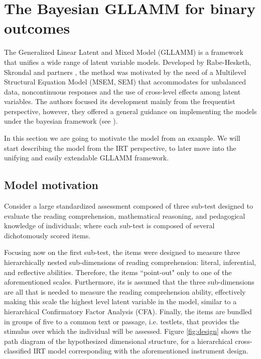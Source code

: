 \chapter{The Bayesian GLLAMM for binary outcomes} \label{chap:framework}

The Generalized Linear Latent and Mixed Model (GLLAMM) is a framework that unifies a wide range of latent variable models. Developed by Rabe-Hesketh, Skrondal and partners \cite{Rabe_et_al_2004a, Rabe_et_al_2004b, Rabe_et_al_2004c, Skrondal_et_al_2004a, Rabe_et_al_2012}, the method was motivated by the need of a Multilevel Structural Equation Model (MSEM, SEM) that accommodates for unbalanced data, noncontinuous responses and the use of cross-level effects among latent variables. The authors focused its development mainly from the frequentist perspective, however, they offered a general guidance on implementing the models under the bayesian framework (see \citet{Skrondal_et_al_2004a}).

In this section we are going to motivate the model from an example. We will start describing the model from the IRT perspective, to later move into the unifying and easily extendable GLLAMM framework.


\section{Model motivation} \label{sect:motivation}

Consider a large standardized assessment composed of three sub-test designed to evaluate the reading comprehension, mathematical reasoning, and pedagogical knowledge of individuals; where each sub-test is composed of several dichotomously scored items. 

Focusing now on the first sub-test, the items were designed to measure three hierarchically nested sub-dimensions of reading comprehension: literal, inferential, and reflective abilities. Therefore, the items ``point-out" only to one of the aforementioned scales. Furthermore, its is assumed that the three sub-dimensions are all that is needed to measure the reading comprehension ability, effectively making this scale the highest level latent variable in the model, similar to a hierarchical Confirmatory Factor Analysis (CFA). Finally, the items are bundled in groups of five to a common text or passage, i.e. testlets, that provides the stimulus over which the individual will be assessed. Figure \ref{fig:design} shows the path diagram of the hypothesized dimensional structure, for a hierarchical cross-classified IRT model corresponding with the aforementioned instrument design.

